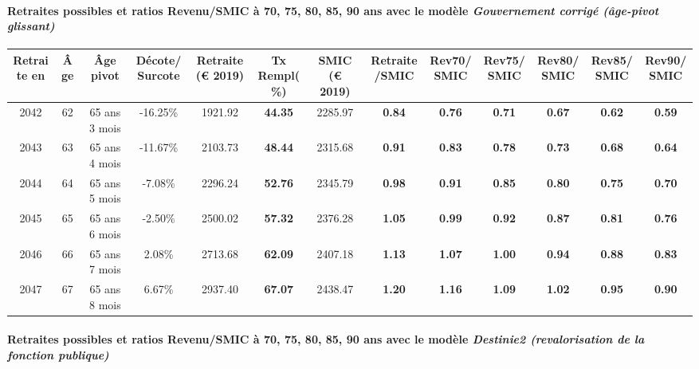 \paragraph{Retraites possibles et ratios Revenu/SMIC à 70, 75, 80, 85, 90 ans avec le modèle \emph{Gouvernement corrigé (âge-pivot glissant)}}  
 
{ \scriptsize \begin{center} 
\begin{tabular}[htb]{|c|c||c|c||c|c||c||c|c|c|c|c|c|} 
\hline 
 Retraite en &  Âge &  Âge pivot &  Décote/Surcote &  Retraite (\euro{} 2019) &  Tx Rempl(\%) &  SMIC (\euro{} 2019) &  Retraite/SMIC &  Rev70/SMIC &  Rev75/SMIC &  Rev80/SMIC &  Rev85/SMIC &  Rev90/SMIC \\ 
\hline \hline 
 2042 &  62 &  65 ans 3 mois &  -16.25\% &  1921.92 &  {\bf 44.35} &  2285.97 &  {\bf {\color{red} 0.84}} &  {\bf {\color{red} 0.76}} &  {\bf {\color{red} 0.71}} &  {\bf {\color{red} 0.67}} &  {\bf {\color{red} 0.62}} &  {\bf {\color{red} 0.59}} \\ 
\hline 
 2043 &  63 &  65 ans 4 mois &  -11.67\% &  2103.73 &  {\bf 48.44} &  2315.68 &  {\bf {\color{red} 0.91}} &  {\bf {\color{red} 0.83}} &  {\bf {\color{red} 0.78}} &  {\bf {\color{red} 0.73}} &  {\bf {\color{red} 0.68}} &  {\bf {\color{red} 0.64}} \\ 
\hline 
 2044 &  64 &  65 ans 5 mois &  -7.08\% &  2296.24 &  {\bf 52.76} &  2345.79 &  {\bf {\color{red} 0.98}} &  {\bf {\color{red} 0.91}} &  {\bf {\color{red} 0.85}} &  {\bf {\color{red} 0.80}} &  {\bf {\color{red} 0.75}} &  {\bf {\color{red} 0.70}} \\ 
\hline 
 2045 &  65 &  65 ans 6 mois &  -2.50\% &  2500.02 &  {\bf 57.32} &  2376.28 &  {\bf 1.05} &  {\bf {\color{red} 0.99}} &  {\bf {\color{red} 0.92}} &  {\bf {\color{red} 0.87}} &  {\bf {\color{red} 0.81}} &  {\bf {\color{red} 0.76}} \\ 
\hline 
 2046 &  66 &  65 ans 7 mois &  2.08\% &  2713.68 &  {\bf 62.09} &  2407.18 &  {\bf 1.13} &  {\bf 1.07} &  {\bf 1.00} &  {\bf {\color{red} 0.94}} &  {\bf {\color{red} 0.88}} &  {\bf {\color{red} 0.83}} \\ 
\hline 
 2047 &  67 &  65 ans 8 mois &  6.67\% &  2937.40 &  {\bf 67.07} &  2438.47 &  {\bf 1.20} &  {\bf 1.16} &  {\bf 1.09} &  {\bf 1.02} &  {\bf {\color{red} 0.95}} &  {\bf {\color{red} 0.90}} \\ 
\hline 
\hline 
\end{tabular} 
\end{center} } 
\paragraph{Retraites possibles et ratios Revenu/SMIC à 70, 75, 80, 85, 90 ans avec le modèle \emph{Destinie2 (revalorisation de la fonction publique)}}  
 

